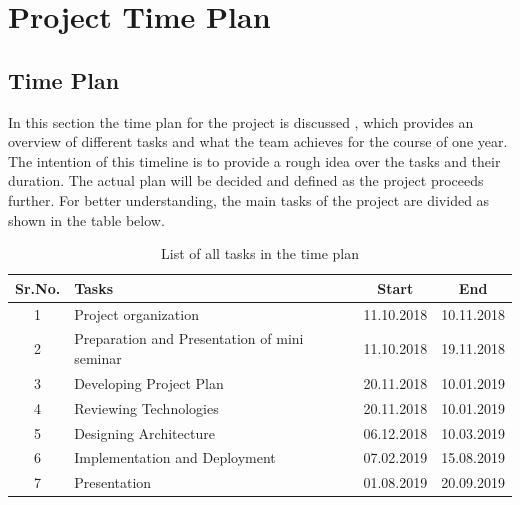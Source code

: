 \chapter{Project Time Plan}
\label{ch:Project Time Plan}

\section{Time Plan}
In this section the time plan for the project is discussed , which provides an overview of different tasks and what the team achieves for the course of one year. The intention of this timeline is to provide a rough idea over the tasks and their duration. The actual plan will be decided and defined as the project proceeds further. For better understanding, the main tasks of the project are divided as shown in the table below.

\begin{table} [h]
\centering
	\begin{tabular}{|c|l|c|c|}
	\hline
		Sr.No. & Tasks & Start & End\\
		\hline
		1 &	Project organization & 11.10.2018 &	10.11.2018\\
		\hline
		2 &	Preparation and Presentation of mini seminar & 11.10.2018 &	19.11.2018\\
		\hline
		3 &	Developing Project Plan & 20.11.2018 & 10.01.2019\\
		\hline
		4 &	Reviewing Technologies & 20.11.2018 & 10.01.2019\\
		\hline
		5 &	Designing Architecture &	06.12.2018 & 10.03.2019\\
		\hline
		6 & Implementation and Deployment &	07.02.2019 & 15.08.2019\\
		\hline
		7 & Presentation &	01.08.2019 & 20.09.2019\\
		\hline
	\end{tabular}
\caption{List of all tasks in the time plan}
\end{table}

